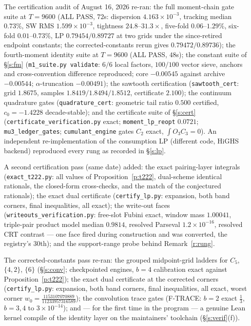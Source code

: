 \documentclass[11pt]{article}
\numberwithin{equation}{section}
\theoremstyle{definition}
\theoremstyle{remark}
\begin{document}
The certification audit of August 16, 2026 re-ran: the full
moment-chain gate suite at $T=9600$ (ALL PASS, $72$s: dispersion $4.163\times
10^{-3}$, tracking median $0.73\%$, SW RMS $1.599\times10^{-3}$,
tightness $24.8$--$31.3\times$, five-fold $0.06$--$1.29\%$,
six-fold $0.01$--$0.73\%$, LP $0.79454/0.89727$ at two grids
under the since-retired endpoint constants; the
corrected-constants rerun gives $0.79472/0.89736$);
the fourth-moment identity suite at $T=9600$ (ALL PASS,
$48$s); the constant suite of \S\ref{s:fm}
(\texttt{m1\_suite.py validate}: $6/6$ local
factors, $100/100$ vector sieve, anchors and cross-convention
difference reproduced; core $-0.00545$ against archive
$-0.00544$; $\alpha$-truncation $-0.00491$); the sawtooth
certification (\texttt{sawtooth\_cert}: grid $1.8675$, samples
$1.8419/1.8494/1.8512$, certificate $2.100$); the continuum
quadrature gates (\texttt{quadrature\_cert}: geometric tail ratio $0.500$
certified, $c_0=-1.4228$ decade-stable); and the certificate
suite of \S\ref{s:cert}
(\texttt{certificate\_verification.py} exact;
\texttt{moment\_lp\_reopt} $0.0721$; \texttt{mu3\_ledger\_gates};
\texttt{cumulant\_engine} gates $C_2$ exact,
$\int O_3C_3=0$). An independent re-implementation of the
consumption LP (different code, HiGHS backend) reproduced every
rung as recorded in \S\ref{s:lp}.

A second certification pass (same date) added: the exact
pairing-layer integrals (\texttt{exact\_t222.py}: all values of
Proposition~\ref{p:t222}, dual-scheme identical rationals, the
closed-form cross-checks, and the match of the conjectured
rationals); the exact dual certificate
(\texttt{certify\_lp.py}: expansion, both band corners, final
inequalities, all exact); the write-out faces
(\texttt{writeouts\_verification.py}: free-slot Fubini exact,
window mass $1.00041$, triple-pair product model median $0.9814$,
resolved Parseval $1.2\times10^{-16}$, resolved CRT contrast ---
one face fired during construction and was converted, the
registry's $30$th); and the support-range probe behind
Remark~\ref{r:rung}.

The corrected-constants pass re-ran: the grouped
midpoint-grid ladders for $C_5$, $\{4,2\}$, $\{6\}$
(\S\ref{s:conv}; checkpointed engines, $b=4$ calibration exact
against Proposition~\ref{p:t222}); the exact dual certificate at
the corrected corners (\texttt{certify\_lp.py}: expansion,
both band corners, final inequalities, all exact, worst corner
$w_0=\tfrac{1153107070889}{11233957316589}$); the convolution
trace gates (F-TRACE: $b=2$ exact $\tfrac13$, $b=3,4$ to
$3\times10^{-14}$); and --- for the first time in the program
--- a genuine Lean kernel compile of the identity layer on the
maintainers' toolchain (\S\ref{s:verif}(f)).
\end{document}
